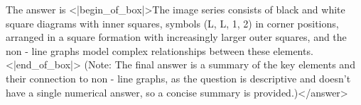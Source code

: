 The answer is <|begin_of_box|>The image series consists of black and white square diagrams with inner squares, symbols (L, L, 1, 2) in corner positions, arranged in a square formation with increasingly larger outer squares, and the non - line graphs model complex relationships between these elements.<|end_of_box|> (Note: The final answer is a summary of the key elements and their connection to non - line graphs, as the question is descriptive and doesn’t have a single numerical answer, so a concise summary is provided.)</answer>